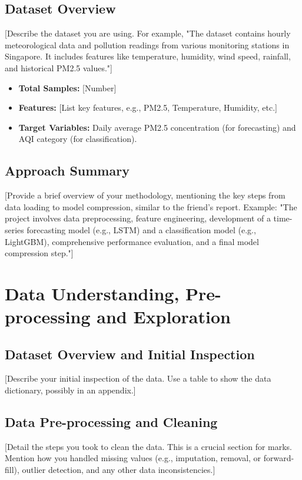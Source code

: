 \documentclass[11pt, a4paper]{article}
\begin{document}
\subsection{Dataset Overview}
[Describe the dataset you are using. For example, "The dataset contains hourly meteorological data and pollution readings from various monitoring stations in Singapore. It includes features like temperature, humidity, wind speed, rainfall, and historical PM2.5 values."]
\begin{itemize}
    \item \textbf{Total Samples:} [Number]
    \item \textbf{Features:} [List key features, e.g., PM2.5, Temperature, Humidity, etc.]
    \item \textbf{Target Variables:} Daily average PM2.5 concentration (for forecasting) and AQI category (for classification).
\end{itemize}

\subsection{Approach Summary}
[Provide a brief overview of your methodology, mentioning the key steps from data loading to model compression, similar to the friend's report. Example: "The project involves data preprocessing, feature engineering, development of a time-series forecasting model (e.g., LSTM) and a classification model (e.g., LightGBM), comprehensive performance evaluation, and a final model compression step."]

\section{Data Understanding, Pre-processing and Exploration}

\subsection{Dataset Overview and Initial Inspection}
[Describe your initial inspection of the data. Use a table to show the data dictionary, possibly in an appendix.]

\subsection{Data Pre-processing and Cleaning}
[Detail the steps you took to clean the data. This is a crucial section for marks. Mention how you handled missing values (e.g., imputation, removal, or forward-fill), outlier detection, and any other data inconsistencies.]
\end{document}
